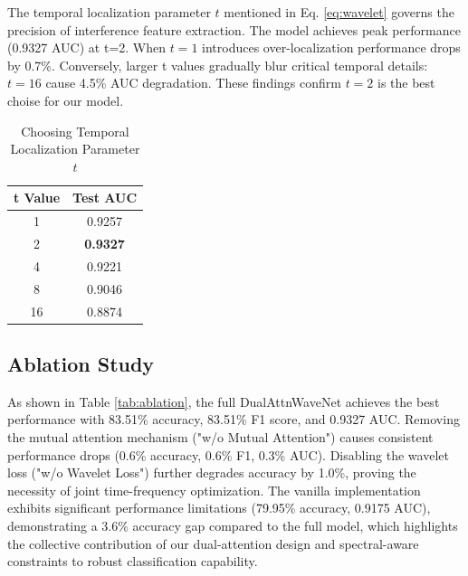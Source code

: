 \documentclass[conference]{IEEEtran}
\begin{document}
The temporal localization parameter $t$ mentioned in Eq. \ref{eq:wavelet} governs the precision of interference feature extraction. The model achieves peak performance (0.9327 AUC) at t=2.  When $t=1$ introduces over-localization performance drops by 0.7\%. Conversely, larger t values gradually blur critical temporal details: $t=16$ cause 4.5\% AUC degradation. These findings confirm $t=2$ is the best choise for our model.

\begin{table}[tb]
    \centering
    \caption{Choosing Temporal Localization Parameter $t$}
    \label{tab:experiment-results}
    \begin{tabular}{cc}
        \toprule
        \textbf{t Value} & \textbf{Test AUC} \\
        \midrule
        1                & 0.9257            \\
        2                & \textbf{0.9327}   \\
        4                & 0.9221            \\
        8                & 0.9046            \\
        16               & 0.8874            \\
        \bottomrule
    \end{tabular}
\end{table}



\subsection{Ablation Study}

As shown in Table \ref{tab:ablation}, the full DualAttnWaveNet achieves the best performance with 83.51\% accuracy, 83.51\% F1 score, and 0.9327 AUC. Removing the mutual attention mechanism ("w/o Mutual Attention") causes consistent performance drops (0.6\% accuracy, 0.6\% F1, 0.3\% AUC). Disabling the wavelet loss ("w/o Wavelet Loss") further degrades accuracy by 1.0\%, proving the necessity of joint time-frequency optimization. The vanilla implementation exhibits significant performance limitations (79.95\% accuracy, 0.9175 AUC), demonstrating a 3.6\% accuracy gap compared to the full model, which highlights the collective contribution of our dual-attention design and spectral-aware constraints to robust classification capability.
\end{document}
